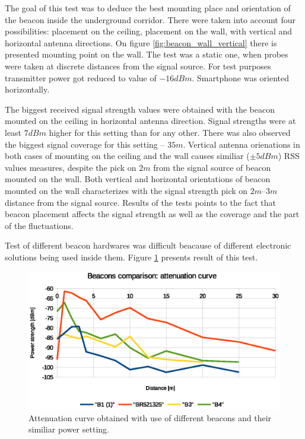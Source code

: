 \documentclass[../main.tex]{subfiles}
\begin{document}
The goal of this test was to deduce the best mounting place and orientation of the beacon inside the underground corridor. There were taken into account four possibilities: placement on the ceiling, placement on the wall, with vertical and horizontal antenna directions. On figure \ref{fig:beacon_wall_vertical} there is presented mounting point on the wall. The test was a static one, when probes were taken at discrete distances from the signal source. For test purposes transmitter power got reduced to value of $-16dBm$. Smartphone was oriented horizontally.

The biggest received signal strength values were obtained with the beacon mounted on the ceiling in horizontal antenna direction. Signal strengths were at least $7dBm$ higher for this setting than for any other. There was also observed the biggest signal coverage for this setting -- $35m$. Vertical antenna orienations in both cases of mounting on the ceiling and the wall causes similiar ($\pm5dBm$) RSS values measures, despite the pick on $2m$ from the signal source of beacon mounted on the wall. Both vertical and horizontal orientations of beacon mounted on the wall characterizes with the signal strength pick on $2m$--$3m$ distance from the signal source. Results of the tests points to the fact that beacon placement affects the signal strength as well as the coverage and the part of the fluctuations.

Test of different beacon hardwares was difficult beacause of different electronic solutions being used inside them. Figure \ref{fig:tests_case8_beacons_comparison} presents result of this test.

\begin{figure}[!htbp]
\includegraphics[width=\textwidth, keepaspectratio]{pictures/tests_case8_beacons_comparison}
\centering
\caption{Attenuation curve obtained with use of different beacons and their similiar power setting.}
\label{fig:tests_case8_beacons_comparison}
\end{figure}
\end{document}
